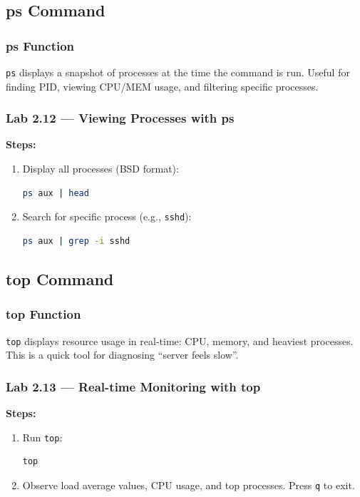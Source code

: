 \subsection{ps Command}
\subsubsection*{ps Function}
\texttt{ps} displays a snapshot of processes at the time the command is run. Useful for finding PID, viewing CPU/MEM usage, and filtering specific processes.

\subsubsection*{Lab 2.12 --- Viewing Processes with ps}
\textbf{Steps:}
\begin{enumerate}
    \item Display all processes (BSD format):
\begin{lstlisting}[language=bash, caption={ps aux}]
ps aux | head
\end{lstlisting}

    \item Search for specific process (e.g., \texttt{sshd}):
\begin{lstlisting}[language=bash, caption={Filter process with grep}]
ps aux | grep -i sshd
\end{lstlisting}
\end{enumerate}

\subsection{top Command}
\subsubsection*{top Function}
\texttt{top} displays resource usage in real-time: CPU, memory, and heaviest processes.
This is a quick tool for diagnosing ``server feels slow''.

\subsubsection*{Lab 2.13 --- Real-time Monitoring with top}
\textbf{Steps:}
\begin{enumerate}
    \item Run \texttt{top}:
\begin{lstlisting}[language=bash, caption={Running top}]
top
\end{lstlisting}

    \item Observe load average values, CPU usage, and top processes. Press \texttt{q} to exit.
\end{enumerate}

